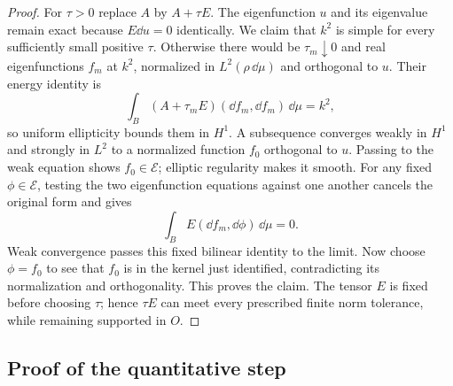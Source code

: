 \begin{proof}
For $\tau>0$ replace $A$ by $A+\tau E$. The eigenfunction $u$ and
its eigenvalue remain exact because $E\dd u=0$ identically. We
claim that $k^2$ is simple for every sufficiently small positive
$\tau$. Otherwise there would be $\tau_m\downarrow0$ and real
eigenfunctions $f_m$ at $k^2$, normalized in $L^2(\rho\,\dd\mu)$
and orthogonal to $u$. Their energy identity is
\[
 \int_B(A+\tau_m E)(\dd f_m,\dd f_m)\,\dd\mu=k^2,
\]
so uniform ellipticity bounds them in $H^1$. A subsequence
converges weakly in $H^1$ and strongly in $L^2$ to a normalized
function $f_0$ orthogonal to $u$. Passing to the weak equation
shows $f_0\in\mathcal E$; elliptic regularity makes it smooth.
For any fixed $\phi\in\mathcal E$, testing the two eigenfunction
equations against one another cancels the original form and gives
\[
 \int_B E(\dd f_m,\dd\phi)\,\dd\mu=0.
\]
Weak convergence passes this fixed bilinear identity to the limit.
Now choose $\phi=f_0$ to see that $f_0$ is in the kernel just
identified, contradicting its normalization and orthogonality.
This proves the claim. The tensor $E$ is fixed before choosing
$\tau$; hence $\tau E$ can meet every prescribed finite norm
tolerance, while remaining supported in $O$.
\end{proof}

\subsection{Proof of the quantitative step}

